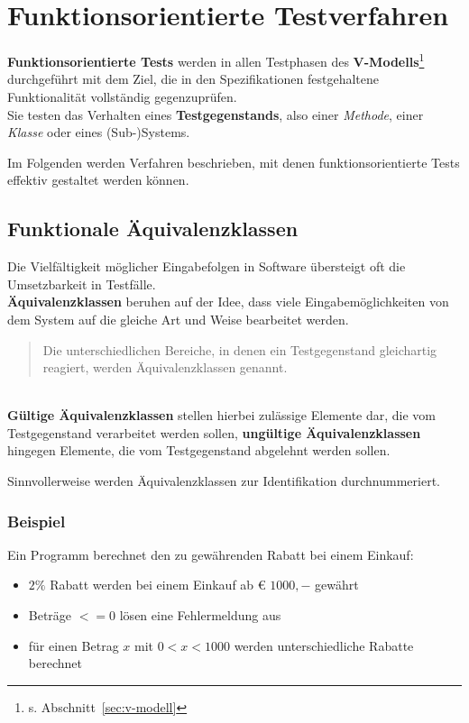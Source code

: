 \section{Funktionsorientierte Testverfahren}

\begin{tcolorbox}
    \textbf{Funktionsorientierte Tests} werden in allen Testphasen des \textbf{V-Modells}\footnote{s. Abschnitt~\ref{sec:v-modell}} durchgeführt mit dem Ziel, die in den Spezifikationen festgehaltene  Funktionalität vollständig gegenzuprüfen.\\
    Sie testen das Verhalten eines \textbf{Testgegenstands}, also einer \textit{Methode}, einer \textit{Klasse} oder eines (Sub-)Systems.
\end{tcolorbox}
\vspace{2mm}

\noindent
Im Folgenden werden Verfahren beschrieben, mit denen funktionsorientierte Tests effektiv gestaltet werden können.

\subsection{Funktionale Äquivalenzklassen}\label{subsec:funktionale-aquivalenzklassen}
Die Vielfältigkeit möglicher Eingabefolgen in Software übersteigt oft die Umsetzbarkeit in Testfälle.\\
\textbf{Äquivalenzklassen} beruhen auf der Idee, dass viele Eingabemöglichkeiten von dem System auf die gleiche Art und Weise bearbeitet werden.

\begin{tcolorbox}[title=Äquivalenzklassen]
    \blockquote[{\cite[43]{Wed09c}}]{
    Die unterschiedlichen Bereiche, in denen ein Testgegenstand gleichartig reagiert, werden Äquivalenzklassen genannt.
    }\\
    \textbf{Gültige Äquivalenzklassen} stellen hierbei zulässige Elemente dar, die vom Testgegenstand verarbeitet werden sollen, \textbf{ungültige Äquivalenzklassen} hingegen Elemente, die vom Testgegenstand abgelehnt werden sollen.
\end{tcolorbox}

\noindent
Sinnvollerweise werden Äquivalenzklassen zur Identifikation durchnummeriert.

\subsubsection*{Beispiel}
Ein Programm berechnet den zu gewährenden Rabatt bei einem Einkauf:
\begin{itemize}
    \item $2\%$ Rabatt werden bei einem Einkauf ab € $1000,-$ gewährt
    \item Beträge $<= 0$ lösen eine Fehlermeldung aus
    \item für einen Betrag $x$ mit $0 < x < 1000$ werden unterschiedliche Rabatte berechnet
\end{itemize}

